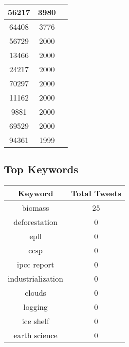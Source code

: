 \documentclass{article}\usepackage[T1]{fontenc}
\begin{document}
\begin{tabular}{|c|c|c|}
 \hline
56217 & 3980\\ 
 \hline
64408 & 3776\\ 
 \hline
56729 & 2000\\ 
 \hline
13466 & 2000\\ 
 \hline
24217 & 2000\\ 
 \hline
70297 & 2000\\ 
 \hline
11162 & 2000\\ 
 \hline
9881 & 2000\\ 
 \hline
69529 & 2000\\ 
 \hline
94361 & 1999\\ 
 \hline
\end{tabular}\subsection*{Top Keywords}\begin{tabular}{|c|c|}         \hline         Keyword & Total Tweets \\ 
 \hline
biomass & 25\\ 
 \hline
deforestation & 0\\ 
 \hline
epfl & 0\\ 
 \hline
ccsp & 0\\ 
 \hline
ipcc report & 0\\ 
 \hline
industrialization & 0\\ 
 \hline
clouds & 0\\ 
 \hline
logging & 0\\ 
 \hline
ice shelf & 0\\ 
 \hline
earth science & 0\\ 
 \hline
\end{tabular}
\end{document}
